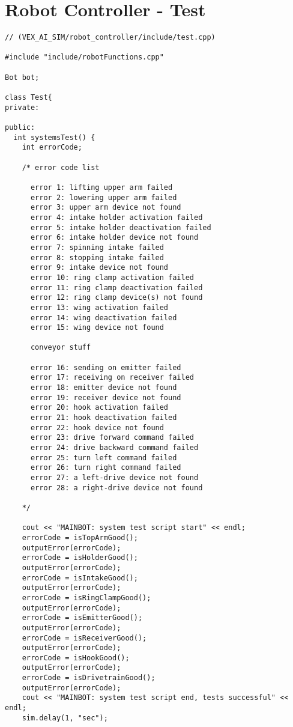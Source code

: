\section*{Robot Controller - Test}
\begin{verbatim}
// (VEX_AI_SIM/robot_controller/include/test.cpp)
 
#include "include/robotFunctions.cpp"
 
Bot bot;
 
class Test{
private:
 
public:
  int systemsTest() {
    int errorCode;
 
    /* error code list
 
      error 1: lifting upper arm failed
      error 2: lowering upper arm failed
      error 3: upper arm device not found
      error 4: intake holder activation failed
      error 5: intake holder deactivation failed
      error 6: intake holder device not found
      error 7: spinning intake failed
      error 8: stopping intake failed
      error 9: intake device not found
      error 10: ring clamp activation failed
      error 11: ring clamp deactivation failed
      error 12: ring clamp device(s) not found
      error 13: wing activation failed
      error 14: wing deactivation failed
      error 15: wing device not found
 
      conveyor stuff
 
      error 16: sending on emitter failed
      error 17: receiving on receiver failed
      error 18: emitter device not found
      error 19: receiver device not found
      error 20: hook activation failed
      error 21: hook deactivation failed
      error 22: hook device not found
      error 23: drive forward command failed
      error 24: drive backward command failed
      error 25: turn left command failed
      error 26: turn right command failed
      error 27: a left-drive device not found
      error 28: a right-drive device not found
 
    */
 
    cout << "MAINBOT: system test script start" << endl;
    errorCode = isTopArmGood();
    outputError(errorCode);
    errorCode = isHolderGood();
    outputError(errorCode);
    errorCode = isIntakeGood();
    outputError(errorCode);
    errorCode = isRingClampGood();
    outputError(errorCode);
    errorCode = isEmitterGood();
    outputError(errorCode);
    errorCode = isReceiverGood();
    outputError(errorCode);
    errorCode = isHookGood();
    outputError(errorCode);
    errorCode = isDrivetrainGood();
    outputError(errorCode);
    cout << "MAINBOT: system test script end, tests successful" << endl;
    sim.delay(1, "sec");
 

\end{verbatim}
